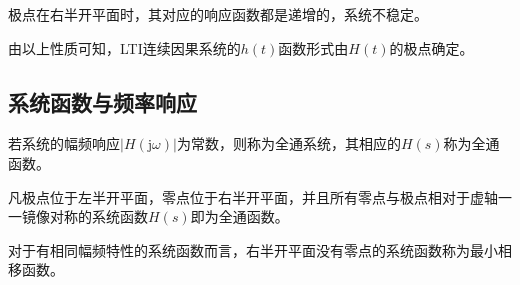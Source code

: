 \begin{BoxProperty}[极点在右半开平面的连续因果系统的时域响应]
    极点在右半开平面时，其对应的响应函数都是递增的，系统不稳定。
\end{BoxProperty}

由以上性质可知，LTI连续因果系统的$h(t)$函数形式由$H(t)$的极点确定。

\subsection{系统函数与频率响应}

\begin{BoxDefinition}[全通函数]
    若系统的幅频响应$|H(\mathrm{j}\omega)|$为常数，则称为全通系统，其相应的$H(s)$称为全通函数。

    凡极点位于左半开平面，零点位于右半开平面，并且所有零点与极点相对于虚轴一一镜像对称的系统函数$H(s)$即为全通函数。
\end{BoxDefinition}

\begin{BoxDefinition}[最小相移函数]
    对于有相同幅频特性的系统函数而言，右半开平面没有零点的系统函数称为最小相移函数。
\end{BoxDefinition}